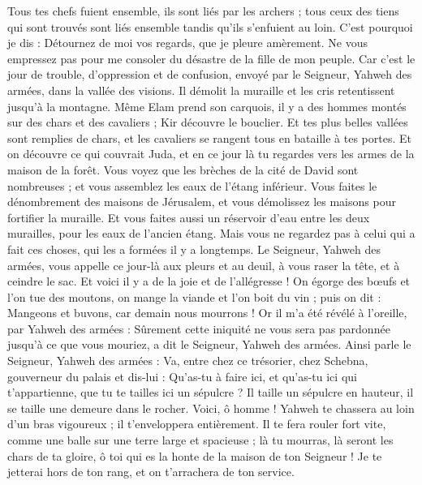 \begin{multicols}{2}
Tous tes chefs fuient ensemble, ils sont liés par les archers ; tous ceux des tiens qui sont trouvés sont liés ensemble tandis qu'ils s'enfuient au loin.
C'est pourquoi je dis : Détournez de moi vos regards, que je pleure amèrement. Ne vous empressez pas pour me consoler du désastre de la fille de mon peuple.
Car c'est le jour de trouble, d'oppression et de confusion, envoyé par le Seigneur, Yahweh des armées, dans la vallée des visions. Il démolit la muraille et les cris retentissent jusqu'à la montagne.
Même Elam prend son carquois, il y a des hommes montés sur des chars et des cavaliers ; Kir découvre le bouclier.
Et tes plus belles vallées sont remplies de chars, et les cavaliers se rangent tous en bataille à tes portes.
Et on découvre ce qui couvrait Juda, et en ce jour là tu regardes vers les armes de la maison de la forêt.
Vous voyez que les brèches de la cité de David sont nombreuses ; et vous assemblez les eaux de l'étang inférieur.
Vous faites le dénombrement des maisons de Jérusalem, et vous démolissez les maisons pour fortifier la muraille.
Et vous faites aussi un réservoir d'eau entre les deux murailles, pour les eaux de l'ancien étang. Mais vous ne regardez pas à celui qui a fait ces choses, qui les a formées il y a longtemps.
Le Seigneur, Yahweh des armées, vous appelle ce jour-là aux pleurs et au deuil, à vous raser la tête, et à ceindre le sac.
Et voici il y a de la joie et de l'allégresse ! On égorge des bœufs et l'on tue des moutons, on mange la viande et l'on boit du vin ; puis on dit : Mangeons et buvons, car demain nous mourrons !
Or il m'a été révélé à l'oreille, par Yahweh des armées : Sûrement cette iniquité ne vous sera pas pardonnée jusqu'à ce que vous mouriez, a dit le Seigneur, Yahweh des armées.
Ainsi parle le Seigneur, Yahweh des armées : Va, entre chez ce trésorier, chez Schebna, gouverneur du palais et dis-lui :
Qu'as-tu à faire ici, et qu'as-tu ici qui t'appartienne, que tu te tailles ici un sépulcre ? Il taille un sépulcre en hauteur, il se taille une demeure dans le rocher.
Voici, ô homme ! Yahweh te chassera au loin d'un bras vigoureux ; il t'enveloppera entièrement.
Il te fera rouler fort vite, comme une balle sur une terre large et spacieuse ; là tu mourras, là seront les chars de ta gloire, ô toi qui es la honte de la maison de ton Seigneur !
Je te jetterai hors de ton rang, et on t'arrachera de ton service.

\end{multicols}
